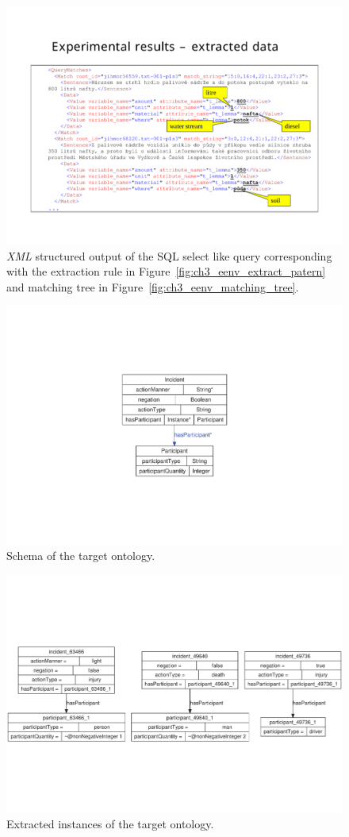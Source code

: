 \begin{figure}
	\centering
		\includegraphics[angle=-90, width=0.7\hsize]{../img/ch3_eenv_results}
	\caption{\emph{XML} structured output of the SQL select like query corresponding with the extraction rule in Figure~\ref{fig:ch3_eenv_extract_patern} and matching tree in Figure~\ref{fig:ch3_eenv_matching_tree}.}
	\label{fig:ch3_eenv_results}
\end{figure}



\begin{figure}
	\centering
		\includegraphics[angle=-90, width=0.3\hsize]{../img/ch3_classes}
	\caption{Schema of the target ontology.}
	\label{fig:ch3_classes}
\end{figure}


\begin{figure}
	\centering
		\includegraphics[angle=-90, width=\hsize]{../img/ch3_instances}
	\caption{Extracted instances of the target ontology.}
	\label{fig:instatnces}
\end{figure}



